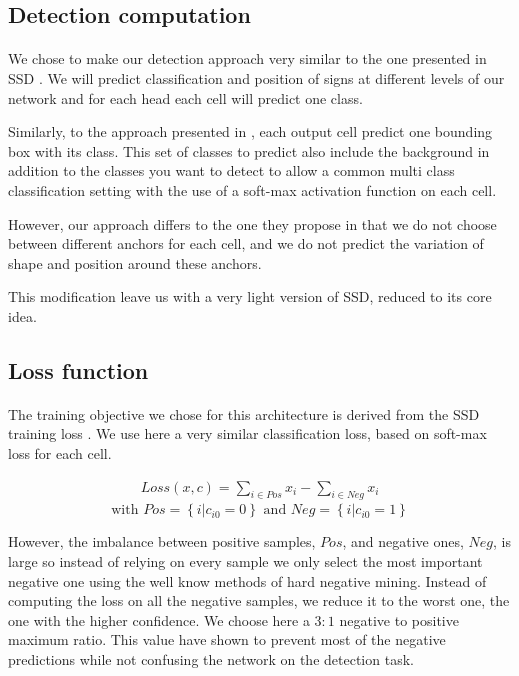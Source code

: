 \subsection{Detection computation}
\paragraph{}
We chose to make our detection approach very similar to the one presented in SSD \cite{liu2016ssd}. We will predict classification and position of signs at different levels of our network and for each head each cell will predict one class.

Similarly, to the approach presented in \cite{liu2016ssd}, each output cell predict one bounding box with its class. This set of classes to predict also include the background in addition to the classes you want to detect to allow a common multi class classification setting with the use of a soft-max activation function on each cell.

However, our approach differs to the one they propose in that we do not choose between different anchors for each cell, and we do not predict the variation of shape and position around these anchors.

This modification leave us with a very light version of SSD, reduced to its core idea.

\subsection{Loss function}
\paragraph{}
The training objective we chose for this architecture is derived from the SSD training loss \cite{liu2016ssd}. We use here a very similar classification loss, based on soft-max loss for each cell.

\begin{align}
     Loss(x,c) = \sum_{i \in Pos} x_i - \sum_{i \in Neg} x_i
\end{align}{}
\[
    \text{with } Pos = \left\{ i | c_{i0} = 0 \right\} \text{ and } Neg = \left\{ i | c_{i0} = 1\right\}
\]

However, the imbalance between positive samples, $Pos$, and negative ones, $Neg$, is large so instead of relying on every sample we only select the most important negative one using the well know methods of hard negative mining. Instead of computing the loss on all the negative samples, we reduce it to the worst one, the one with the higher confidence. We choose here a $3:1$ negative to positive maximum ratio. This value have shown to prevent most of the negative predictions while not confusing the network on the detection task.

